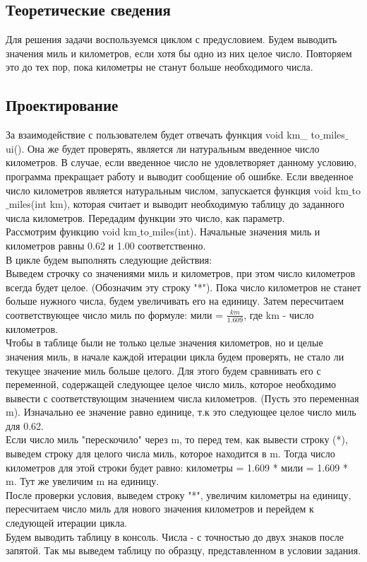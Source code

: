 \documentclass[12pt,a4paper]{report}
\begin{document}
\subsection{Теоретические сведения}

Для решения задачи воспользуемся циклом с предусловием. Будем выводить значения миль и километров, если хотя бы одно из них целое число. Повторяем это до тех пор, пока километры не станут больше необходимого числа. 
\subsection{Проектирование}
За взаимодействие с пользователем будет отвечать функция void km\_ to$\_$miles$\_$ui(). Она же будет проверять, является ли натуральным введенное число километров. В случае, если введенное число не удовлетворяет данному условию, программа прекращает работу и выводит сообщение об ошибке. Если введенное число километров является натуральным числом, запускается функция void km$\_$to$\_$miles(int km), которая считает и выводит необходимую таблицу до заданного числа километров. Передадим функции это число, как параметр. \\
Рассмотрим функцию void km$\_$to$\_$miles(int). Начальные значения миль и километров равны 0.62 и 1.00 соответственно. \\
В цикле будем выполнять следующие действия: \\
Выведем строчку со значениями миль и километров, при этом число километров всегда будет целое. (Обозначим эту строку "*"). Пока число километров не станет больше нужного числа, будем увеличивать его на единицу. Затем пересчитаем соответствующее число миль по формуле: мили = $\frac{km}{1.609}$, где km - число километров. \\
Чтобы в таблице были не только целые значения километров, но и целые значения миль, в начале каждой итерации цикла будем проверять, не стало ли текущее значение миль больше целого. Для этого будем сравнивать его с переменной, содержащей следующее целое число миль, которое необходимо вывести с соответствующим значением числа километров. (Пусть это переменная m). Изначально ее значение равно единице, т.к это следующее целое число миль для 0.62. \\
Если число миль "перескочило" через m, то перед тем, как вывести строку (*), выведем строку для целого числа миль, которое находится в m. Тогда число километров для этой строки будет равно: километры = 1.609 * мили = 1.609 * m. Тут же увеличим m на единицу. \\
После проверки условия, выведем строку "*", увеличим километры на единицу, пересчитаем число миль для нового значения километров и перейдем к следующей итерации цикла.  \\
Будем выводить таблицу в консоль. Числа - с точностью до двух знаков после запятой. Так мы выведем таблицу по образцу, представленном в условии задания. 
\end{document}
